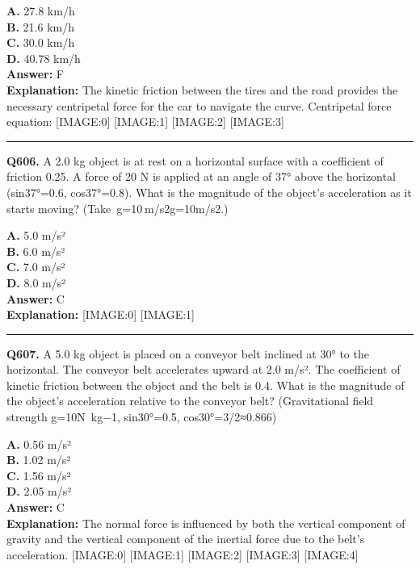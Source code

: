 \documentclass[12pt]{article}
\begin{document}
\textbf{A.} 27.8 km/h \\
\textbf{B.} 21.6 km/h \\
\textbf{C.} 30.0 km/h \\
\textbf{D.} 40.78 km/h \\

\textbf{Answer:} F \\
\textbf{Explanation:} The kinetic friction between the tires and the road provides the necessary centripetal force for the car to navigate the curve.
Centripetal force equation:
[IMAGE:0]
[IMAGE:1]
[IMAGE:2]
[IMAGE:3]

\hrule
\vspace{1em}


\noindent
\textbf{Q606.} A 2.0 kg object is at rest on a horizontal surface with a coefficient of friction 0.25. A force of 20 N is applied at an angle of 37° above the horizontal (sin37°=0.6, cos37°=0.8). What is the magnitude of the object’s acceleration as it starts moving? (Take g=10 m/s2g=10m/s2.)



\textbf{A.} 5.0 m/s² \\
\textbf{B.} 6.0 m/s² \\
\textbf{C.} 7.0 m/s² \\
\textbf{D.} 8.0 m/s² \\

\textbf{Answer:} C \\
\textbf{Explanation:} [IMAGE:0]
[IMAGE:1]

\hrule
\vspace{1em}


\noindent
\textbf{Q607.} A 5.0 kg object is placed on a conveyor belt inclined at 30° to the horizontal. The conveyor belt accelerates upward at 2.0 m/s². The coefficient of kinetic friction between the object and the belt is 0.4. What is the magnitude of the object's acceleration relative to the conveyor belt? (Gravitational field strength g=10N kg−1, sin30°=0.5, cos30°=3​/2≈0.866)



\textbf{A.} 0.56 m/s² \\
\textbf{B.} 1.02 m/s² \\
\textbf{C.} 1.56 m/s² \\
\textbf{D.} 2.05 m/s² \\

\textbf{Answer:} C \\
\textbf{Explanation:} The normal force is influenced by both the vertical component of gravity and the vertical component of the inertial force due to the belt's acceleration.
[IMAGE:0]
[IMAGE:1]
[IMAGE:2]
[IMAGE:3]
[IMAGE:4]
\end{document}
